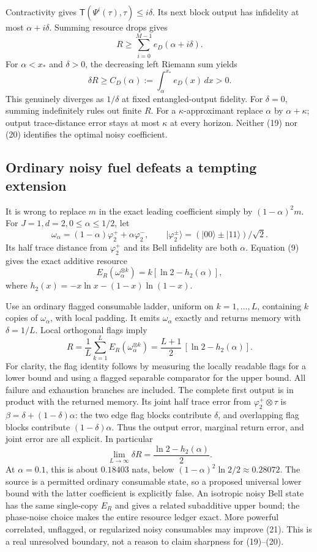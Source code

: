 \documentclass[11pt,a4paper]{article}
\newcommand{\ER}{E_R}
\newcommand{\dist}{\mathsf T}
\newcommand{\ph}{\varphi}
\newcommand{\hbin}{h_2}
\begin{document}
Contractivity gives \(\dist(\Psi^i(\tau),\tau)\le i\delta\).
Its next block output has infidelity at most \(\alpha+i\delta\).
Summing resource drops gives
\[
 R\ge\sum_{i=0}^{M-1}e_D(\alpha+i\delta).
\]
For \(\alpha<x_*\) and \(\delta>0\), the decreasing left Riemann sum yields
\[
 \boxed{\qquad
 \delta R\ge C_D(\alpha):=
                    \int_\alpha^{x_*}e_D(x)\,dx>0 .
 \qquad}                                                   \tag{20}
\]
This genuinely diverges as \(1/\delta\) at fixed entangled-output fidelity.
For \(\delta=0\), summing indefinitely rules out finite \(R\).
For a \(\kappa\)-approximant replace \(\alpha\) by \(\alpha+\kappa\);
output trace-distance error stays at most \(\kappa\) at every horizon.
Neither (19) nor (20) identifies the optimal noisy coefficient.

\subsection{Ordinary noisy fuel defeats a tempting extension}
It is wrong to replace \(m\) in the exact leading coefficient simply by
\((1-\alpha)^2m\).
For \(J=1,d=2,0\le\alpha\le1/2\), let
\[
 \omega_\alpha=(1-\alpha)\ph_2^++\alpha\ph_2^-,
 \qquad |\ph_2^\pm\rangle=(|00\rangle\pm|11\rangle)/\sqrt2 .
\]
Its half trace distance from \(\ph_2^+\) and its Bell infidelity are both
\(\alpha\). Equation (9) gives the exact additive resource
\[
 \ER(\omega_\alpha^{\otimes k})
                         =k[\ln2-\hbin(\alpha)],
\]
where \(\hbin(x)=-x\ln x-(1-x)\ln(1-x)\).

Use an ordinary flagged consumable ladder, uniform on \(k=1,\ldots,L\),
containing \(k\) copies of \(\omega_\alpha\), with local padding.
It emits \(\omega_\alpha\) exactly and returns memory with
\(\delta=1/L\). Local orthogonal flags imply
\[
 R=\frac1L\sum_{k=1}^L\ER(\omega_\alpha^{\otimes k})
       = \frac{L+1}{2}\,[\ln2-\hbin(\alpha)] .
\]
For clarity, the flag identity follows by measuring the locally readable
flags for a lower bound and using a flagged separable comparator for the
upper bound. All failure and exhaustion branches are included.
The complete first output is in product with the returned memory.
Its joint half trace error from \(\ph_2^+\otimes\tau\) is
\(\beta=\delta+(1-\delta)\alpha\): the two edge flag blocks contribute
\(\delta\), and overlapping flag blocks contribute \((1-\delta)\alpha\).
Thus the output error, marginal return error, and joint error are all explicit.
In particular
\[
 \lim_{L\to\infty}\delta R
                  =\frac{\ln2-\hbin(\alpha)}2.              \tag{21}
\]
At \(\alpha=0.1\), this is about \(0.18403\) nats, below
\((1-\alpha)^2\ln2/2\approx0.28072\).
The source is a permitted ordinary consumable state, so a proposed universal
lower bound with the latter coefficient is explicitly false.
An isotropic noisy Bell state has the same single-copy \(E_R\) and gives
a related subadditive upper bound; the phase-noise choice makes the entire
resource ledger exact.
More powerful correlated, unflagged, or regularized noisy consumables may
improve (21). This is a real unresolved boundary, not a reason to claim
sharpness for (19)--(20).
\end{document}
